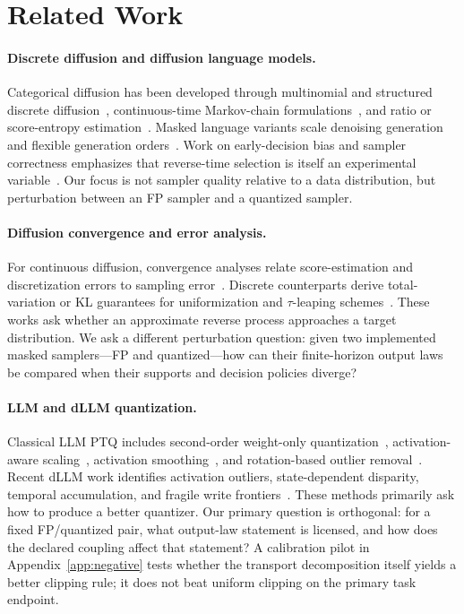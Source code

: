 \section{Related Work}
\label{sec:related}

\paragraph{Discrete diffusion and diffusion language models.}
Categorical diffusion has been developed through multinomial and structured discrete diffusion~\citep{hoogeboom2021argmax,austin2021d3pm}, continuous-time Markov-chain formulations~\citep{campbell2022continuous}, and ratio or score-entropy estimation~\citep{lou2024sedd}. Masked language variants scale denoising generation and flexible generation orders~\citep{sahoo2024mdlm,arriola2025bd3lm,nie2025smdm,nie2025llada,ye2025dream}. Work on early-decision bias and sampler correctness emphasizes that reverse-time selection is itself an experimental variable~\citep{kim2026early,tang2026sampler}. Our focus is not sampler quality relative to a data distribution, but perturbation between an FP sampler and a quantized sampler.

\paragraph{Diffusion convergence and error analysis.}
For continuous diffusion, convergence analyses relate score-estimation and discretization errors to sampling error~\citep{chen2023sampling,benton2024dlinear}. Discrete counterparts derive total-variation or KL guarantees for uniformization and $\tau$-leaping schemes~\citep{chen2024uniformization,ren2024discretecontinuous,liang2025absorb}. These works ask whether an approximate reverse process approaches a target distribution. We ask a different perturbation question: given two implemented masked samplers---FP and quantized---how can their finite-horizon output laws be compared when their supports and decision policies diverge?

\paragraph{LLM and dLLM quantization.}
Classical LLM PTQ includes second-order weight-only quantization~\citep{frantar2023gptq}, activation-aware scaling~\citep{lin2024awq}, activation smoothing~\citep{xiao2023smoothquant}, and rotation-based outlier removal~\citep{ashkboos2024quarot}. Recent dLLM work identifies activation outliers, state-dependent disparity, temporal accumulation, and fragile write frontiers~\citep{lin2025qdllm,xu2025dllmquant,zhang2026quantdllm,yan2026starquant,huang2026faircalib}. These methods primarily ask how to produce a better quantizer. Our primary question is orthogonal: for a fixed FP/quantized pair, what output-law statement is licensed, and how does the declared coupling affect that statement? A calibration pilot in Appendix~\ref{app:negative} tests whether the transport decomposition itself yields a better clipping rule; it does not beat uniform clipping on the primary task endpoint.

